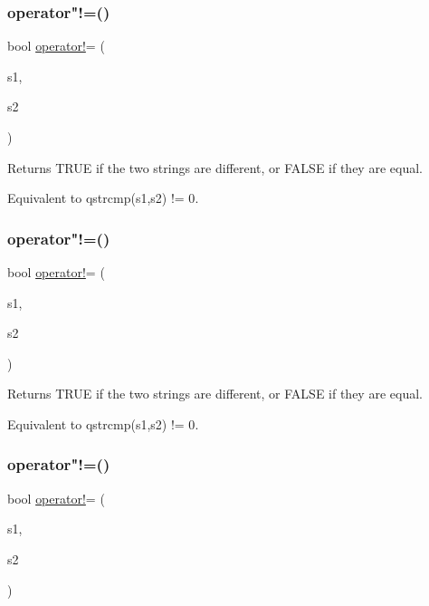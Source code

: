 \subsubsection{\texorpdfstring{operator"!=()}{operator!=()}\hspace{0.1cm}{\footnotesize\ttfamily [1/3]}}
{\footnotesize\ttfamily bool \mbox{\hyperlink{class_q_string_a3c2e731ef300d9d649d976148f60f47c}{operator!}}= (\begin{DoxyParamCaption}\item[{const char $\ast$}]{s1,  }\item[{const \mbox{\hyperlink{class_q_string}{Q\+String}} \&}]{s2 }\end{DoxyParamCaption})\hspace{0.3cm}{\ttfamily [related]}}

Returns T\+R\+UE if the two strings are different, or F\+A\+L\+SE if they are equal.

Equivalent to {\ttfamily qstrcmp(s1,s2) != 0}. \mbox{\label{class_q_string_a77e694c60b1699442a3f13e8bbc0c4a9}} 
\subsubsection{\texorpdfstring{operator"!=()}{operator!=()}\hspace{0.1cm}{\footnotesize\ttfamily [2/3]}}
{\footnotesize\ttfamily bool \mbox{\hyperlink{class_q_string_a3c2e731ef300d9d649d976148f60f47c}{operator!}}= (\begin{DoxyParamCaption}\item[{const \mbox{\hyperlink{class_q_string}{Q\+String}} \&}]{s1,  }\item[{const char $\ast$}]{s2 }\end{DoxyParamCaption})\hspace{0.3cm}{\ttfamily [related]}}

Returns T\+R\+UE if the two strings are different, or F\+A\+L\+SE if they are equal.

Equivalent to {\ttfamily qstrcmp(s1,s2) != 0}. \mbox{\label{class_q_string_aaeae05f02ef07005a07ac285706920dd}} 
\subsubsection{\texorpdfstring{operator"!=()}{operator!=()}\hspace{0.1cm}{\footnotesize\ttfamily [3/3]}}
{\footnotesize\ttfamily bool \mbox{\hyperlink{class_q_string_a3c2e731ef300d9d649d976148f60f47c}{operator!}}= (\begin{DoxyParamCaption}\item[{const \mbox{\hyperlink{class_q_string}{Q\+String}} \&}]{s1,  }\item[{const \mbox{\hyperlink{class_q_string}{Q\+String}} \&}]{s2 }\end{DoxyParamCaption})\hspace{0.3cm}{\ttfamily [related]}}

